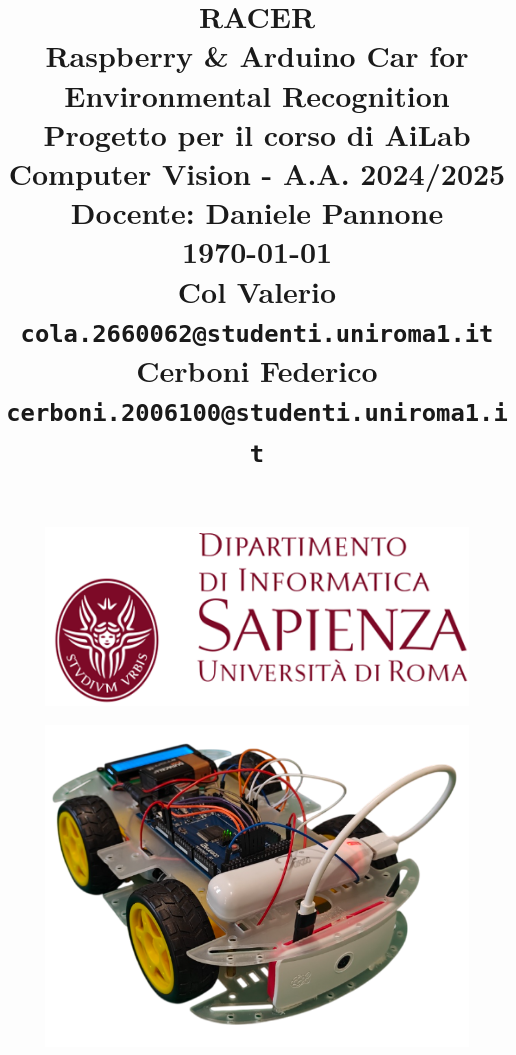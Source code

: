 \documentclass{article}
\begin{document}
\begin{figure}
    \includegraphics[width=0.45\linewidth]{img/logo.png}
\end{figure}

\title{%
  \textbf{RACER} \\
  \Large\textbf{Raspberry \& Arduino Car for Environmental Recognition} \\
  \vspace{1cm}
  \large{Progetto per il corso di AiLab Computer Vision - A.A. 2024/2025} \\
  \vspace{0.5cm}
  \large{Docente: Daniele Pannone} \\
  \vspace{0.5cm}
  \large \today\\[24pt]
    
  \large{Col Valerio \texttt{cola.2660062@studenti.uniroma1.it}}\\
  \large{Cerboni Federico \texttt{cerboni.2006100@studenti.uniroma1.it}} 
}

\date{}
\maketitle

\begin{figure}[h!]
    \centering
    \includegraphics[width=0.7\linewidth]{img/racer.png}
\end{figure}
\end{document}
